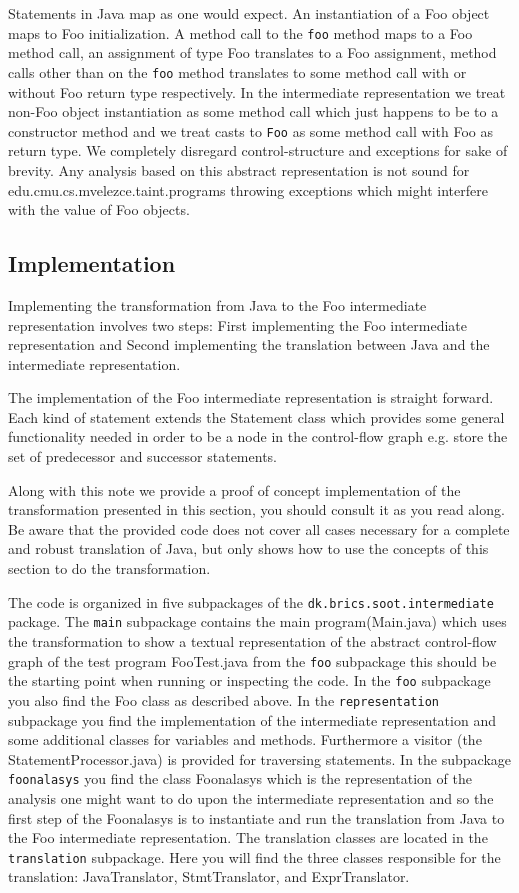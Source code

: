 \documentclass{article}
\newcommand{\code}[1]{\texttt{\small #1}}
\begin{document}
Statements in Java map as one would expect. An instantiation of a Foo
object maps to Foo initialization. A method call to the \code{foo}
method maps to a Foo method call, an assignment of type Foo translates
to a Foo assignment, method calls other than on the \code{foo} method
translates to some method call with or without Foo return type
respectively. In the intermediate representation we treat non-Foo
object instantiation as some method call which just happens to be to a
constructor method and we treat casts to \code{Foo} as some method
call with Foo as return type. We completely disregard
control-structure and exceptions for sake of brevity. Any analysis
based on this abstract representation is not sound for edu.cmu.cs.mvelezce.taint.programs
throwing exceptions which might interfere with the value of Foo
objects.

\subsection{Implementation}
Implementing the transformation from Java to the Foo intermediate
representation involves two steps: First implementing the Foo
intermediate representation and Second implementing the translation
between Java and the intermediate representation. 

The implementation of the Foo intermediate representation is straight
forward. Each kind of statement extends the Statement class which
provides some general functionality needed in order to be a node in
the control-flow graph e.g. store the set of predecessor and successor
statements.

Along with this note we provide a proof of concept implementation of
the transformation presented in this section, you should consult it as
you read along. Be aware that the provided code does not cover all
cases necessary for a complete and robust translation of Java, but
only shows how to use the concepts of this section to do the
transformation.

The code is organized in five subpackages of the
\code{dk.brics.soot.intermediate} package. The \code{main} subpackage
contains the main program(Main.java) which uses the transformation to
show a textual representation of the abstract control-flow graph of
the test program FooTest.java from the \code{foo} subpackage this should
be the starting point when running or inspecting the code. In the
\code{foo} subpackage you also find the Foo class as described above.
%
In the \code{representation} subpackage you find the implementation of
the intermediate representation and some additional classes for
variables and methods. Furthermore a visitor (the
StatementProcessor.java) is provided for traversing statements.
%
In the subpackage \code{foonalasys} you find the class Foonalasys which
is the representation of the analysis one might want to do upon the
intermediate representation and so the first step of the Foonalasys is
to instantiate and run the translation from Java to the Foo
intermediate representation.
%
The translation classes are located in the \code{translation}
subpackage. Here you will find the three classes responsible for the
translation: JavaTranslator, StmtTranslator, and ExprTranslator.\\
\end{document}
